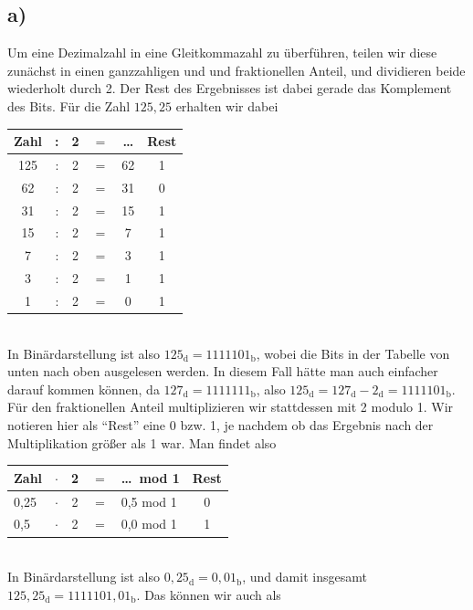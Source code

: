 \documentclass[english, parskip=full]{scrartcl}
\newcommand{\tecxt}{}
\begin{document}
\subsection*{a)}
Um eine Dezimalzahl in eine Gleitkommazahl zu überführen, teilen wir diese zunächst in einen ganzzahligen und und fraktionellen Anteil, und dividieren beide wiederholt durch 2.
Der Rest des Ergebnisses ist dabei gerade das Komplement des Bits.
Für die Zahl $125,25$ erhalten wir dabei
\begin{table}[!ht]
\centering
\begin{tabular}{ccccc|c}
Zahl & : & 2 & $=$ & \dots  & Rest\\ \hline
125 & : & 2 & $=$ & 62 & 1\\
62 & : & 2 & $=$ & 31 & 0\\
31 & : & 2 & $=$ & 15 & 1\\
15 & : & 2 & $=$ & 7 & 1\\
7 & : & 2 & $=$ & 3 & 1\\
3 & : & 2 & $=$ & 1 & 1\\
1 & : & 2 & $=$ & 0 & 1\\
\end{tabular}
\end{table}
\\
In Binärdarstellung ist also $125_\tecxt\text{d} = 1111101_\tecxt\text{b}$, wobei die Bits in der Tabelle von unten nach oben ausgelesen werden.
In diesem Fall hätte man auch einfacher darauf kommen können, da $127_\tecxt\text{d} = 1111111_\tecxt\text{b}$, also $125_\tecxt\text{d} = 127_\tecxt\text{d} - 2_\tecxt\text{d} = 1111101_\tecxt\text{b}$.
\\
Für den fraktionellen Anteil multiplizieren wir stattdessen mit 2 modulo 1.
Wir notieren hier als ``Rest'' eine 0 bzw. 1, je nachdem ob das Ergebnis nach der Multiplikation größer als 1 war.
Man findet also
\begin{table}[!ht]
\centering
\begin{tabular}{lcccl|c}
Zahl & $\cdot$ & 2 & $=$ & \dots\ mod 1  & Rest\\ \hline
0,25 & $\cdot$ & 2 & $=$ & 0,5 mod 1 & 0\\
0,5 & $\cdot$ & 2 & $=$ & 0,0 mod 1 & 1\\
\end{tabular}
\end{table}
\\
In Binärdarstellung ist also $0,25_\tecxt\text{d} = 0,01_\tecxt\text{b}$, und damit insgesamt $125,25_\tecxt\text{d} = 1111101,01_\tecxt\text{b}$.
Das können wir auch als
\end{document}
